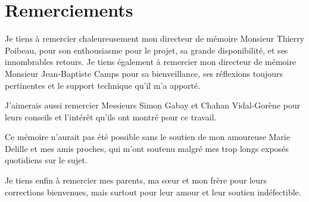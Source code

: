 \chapter*{Remerciements}
\bigskip



Je tiens à remercier chaleureusement mon directeur de mémoire Monsieur Thierry Poibeau, pour son enthousiasme pour le projet, sa grande disponibilité, et ses innombrables retours. Je tiens également à remercier mon directeur de mémoire Monsieur Jean-Baptiste Camps pour sa bienveillance, ses réflexions toujours pertinentes et le support technique qu'il m'a apporté. 

J’aimerais aussi remercier Messieurs Simon Gabay et Chahan Vidal-Gorène pour leurs conseils et l’intérêt qu’ils ont montré pour ce travail.

Ce mémoire n'aurait pas été possible sans le soutien de mon amoureuse Marie Delille et mes amis proches, qui m'ont soutenu malgré mes trop longs exposés quotidiens sur le sujet.

Je tiens enfin à remercier mes parents, ma sœur et mon frère pour leurs corrections bienvenues, mais surtout pour leur amour et leur soutien indéfectible.

